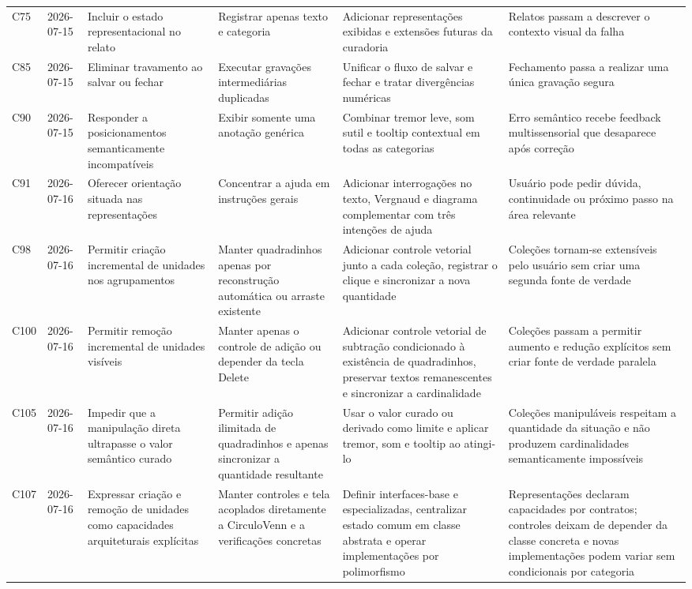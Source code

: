 \begin{landscape}
\begin{longtable}{p{1.0cm}p{1.9cm}p{4.0cm}p{5.0cm}p{6.2cm}p{5.7cm}}
\addlinespace[2pt]
C75 & 2026-07-15 & Incluir o estado representacional no relato & Registrar apenas texto e categoria & Adicionar representações exibidas e extensões futuras da curadoria & Relatos passam a descrever o contexto visual da falha \\
\addlinespace[2pt]
C85 & 2026-07-15 & Eliminar travamento ao salvar ou fechar & Executar gravações intermediárias duplicadas & Unificar o fluxo de salvar e fechar e tratar divergências numéricas & Fechamento passa a realizar uma única gravação segura \\
\addlinespace[2pt]
C90 & 2026-07-15 & Responder a posicionamentos semanticamente incompatíveis & Exibir somente uma anotação genérica & Combinar tremor leve, som sutil e tooltip contextual em todas as categorias & Erro semântico recebe feedback multissensorial que desaparece após correção \\
\addlinespace[2pt]
C91 & 2026-07-16 & Oferecer orientação situada nas representações & Concentrar a ajuda em instruções gerais & Adicionar interrogações no texto, Vergnaud e diagrama complementar com três intenções de ajuda & Usuário pode pedir dúvida, continuidade ou próximo passo na área relevante \\
\addlinespace[2pt]
C98 & 2026-07-16 & Permitir criação incremental de unidades nos agrupamentos & Manter quadradinhos apenas por reconstrução automática ou arraste existente & Adicionar controle vetorial junto a cada coleção, registrar o clique e sincronizar a nova quantidade & Coleções tornam-se extensíveis pelo usuário sem criar uma segunda fonte de verdade \\
\addlinespace[2pt]
C100 & 2026-07-16 & Permitir remoção incremental de unidades visíveis & Manter apenas o controle de adição ou depender da tecla Delete & Adicionar controle vetorial de subtração condicionado à existência de quadradinhos, preservar textos remanescentes e sincronizar a cardinalidade & Coleções passam a permitir aumento e redução explícitos sem criar fonte de verdade paralela \\
\addlinespace[2pt]
C105 & 2026-07-16 & Impedir que a manipulação direta ultrapasse o valor semântico curado & Permitir adição ilimitada de quadradinhos e apenas sincronizar a quantidade resultante & Usar o valor curado ou derivado como limite e aplicar tremor, som e tooltip ao atingi-lo & Coleções manipuláveis respeitam a quantidade da situação e não produzem cardinalidades semanticamente impossíveis \\
\addlinespace[2pt]
C107 & 2026-07-16 & Expressar criação e remoção de unidades como capacidades arquiteturais explícitas & Manter controles e tela acoplados diretamente a CirculoVenn e a verificações concretas & Definir interfaces-base e especializadas, centralizar estado comum em classe abstrata e operar implementações por polimorfismo & Representações declaram capacidades por contratos; controles deixam de depender da classe concreta e novas implementações podem variar sem condicionais por categoria \\

\end{longtable}
\end{landscape}
